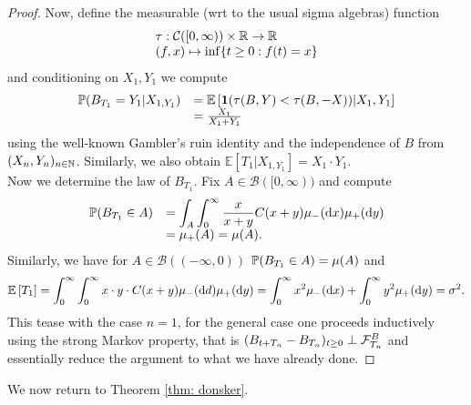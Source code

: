 \documentclass{article}
\begin{document}
\begin{proof}
    Now, define the measurable (wrt to the usual sigma algebras) function 
\[
\begin{array}{ll}
    \tau: \mathcal{C}([0,\infty))\times \mathbb{R} \to \mathbb{R} \\
    (f, x)\mapsto \displaystyle\inf\{t\geq 0 : f(t)=x\}
\end{array}
\]
and conditioning on $ X_{1}, Y_{1}$ we compute 
    \[
    \begin{array}{ll}
	    \mathbb{P}(B_{T_{1}}=Y_{1}|X_{1, Y_{1}}) &= \mathbb{E}\left[ \mathbf{1}(\tau(B, Y)<\tau(B, -X))| X_{1}, Y_{1} \right] \\
         &= \frac{X_{1}}{X_{1}+Y_{1}}
    \end{array}
    \]
    using the well-known Gambler's ruin identity and the independence of $ B$ from $ (X_{n}, Y_{n})_{n\in \mathbb{N}}$. Similarly, we also obtain $ \mathbb{E}\left[ T_{1} |X_{1, Y_{1}}\right]= X_{1}\cdot Y_{1}$.\\ 

    Now we determine the law of $ B_{T_{1}}$. Fix $ A\in \mathcal{B}([0,\infty))$ and compute
    \[
    \begin{array}{ll}
	    \mathbb{P}(B_{T_{1}}\in A)&= \displaystyle\int_{A} \displaystyle\int^{\infty}_{0} \frac{x}{x+y}C(x+y) \mu_{-}( \operatorname{d}\! x) \mu_{+} (  \operatorname{d}\! y)\\ 
			       &= \mu_{+}(A) = \mu(A). 
    \end{array}
    \]
    Similarly, we have for $ A\in \mathcal{B}((-\infty,0))$ $\mathbb{P}(B_{T_{1}}\in A)=\mu(A) $ and 
    \[
    \mathbb{E}\left[ T_{1} \right]= \displaystyle\int^{\infty}_{0} \displaystyle\int^{\infty}_{0}x\cdot y\cdot C(x+y) \mu_{-}( \operatorname{d}\! d) \mu_{+}(   \operatorname{d}\! y)  = \displaystyle\int^{\infty}_{0}x^{2}\mu_{-}( \operatorname{d}\! x) +    \displaystyle\int^{\infty}_{0}y^{2}\mu_{+}( \operatorname{d}\! y) = \sigma^{2}. 
    \]
    This tease with the case $ n=1$, for the general case one proceeds inductively using the strong Markov property, that is $ (B_{t+T_{n}}-B_{T_{n}})_{t\geq 0}\perp \mathcal{F}^{B}_{T_{n}}$ and essentially reduce the argument to what we have already done.
\end{proof}

We now return to Theorem \ref{thm: donsker}.
\end{document}
